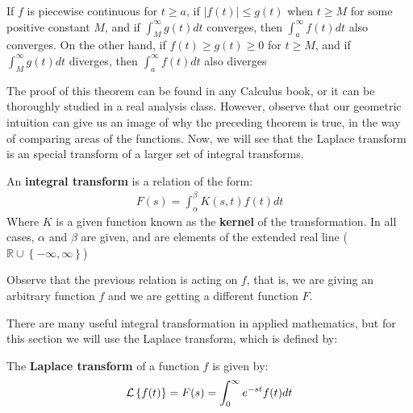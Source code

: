 \begin{thm}
	If $f$ is piecewise continuous for $t \geq a$, if $ \vert f(t) \vert \leq g(t) $ when $t \geq M$ for some positive constant $M$, and if $ \int_M^\infty g(t)dt $ converges, then $ \int_a^{\infty} f(t) dt $ also converges. On the other hand, if $f(t) \geq g(t) \geq 0 $ for $ t \geq M$, and if $ \int_M^{\infty} g(t) dt $ diverges, then $ \int_a^{\infty} f(t) dt $ also diverges
\end{thm} 
The proof of this theorem can be found in any Calculus book, or it can be thoroughly studied in a real analysis class.
However, observe that our geometric intuition can give us an image of why the preceding theorem is true, in the way of comparing areas of the functions.
Now, we will see that the Laplace transform is an special transform of a larger set of integral transforms.
\begin{define}
	An \textbf{integral transform} is a relation of the form:
	\begin{align*}
	F(s) = \int_{\alpha}^{\beta} K(s,t)f(t) dt
	\end{align*}
	Where $K$ is a given function known as the \textbf{kernel} of the transformation. In all cases, $ \alpha $ and $ \beta$ are given, and are elements of the extended real line ($\mathbb{R} \cup \left\lbrace  -\infty,\infty \right\rbrace$) 
	\end{define}
Observe that the previous relation is acting on $f$, that is, we are giving an arbitrary function $f$ and we are getting a different function $F$.

There are many useful integral transformation in applied mathematics, but for this section we will use the Laplace transform, which is defined by:
\begin{define}
	The \textbf{Laplace transform} of a function $f$ is given by:
	\begin{align*}
	\mathcal{L}\left\lbrace f(t) \right\rbrace = F(s) = \int_0^{\infty} e^{-st}f(t)dt
	\end{align*}
\end{define}

